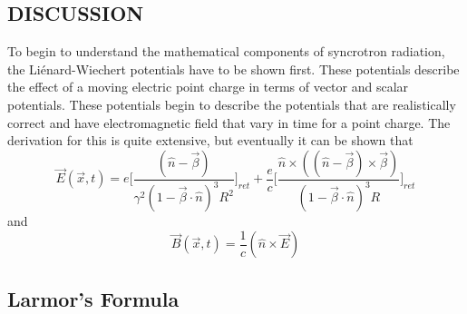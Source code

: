 \documentclass[a4paper]{article}
\begin{document}
\begin{center}
\section{DISCUSSION}
\end{center}

To begin to understand the mathematical components of syncrotron radiation, the Liénard-Wiechert potentials have to be shown first. These potentials describe the effect of a moving electric point charge in terms of vector and scalar potentials. These potentials begin to describe the potentials that are realistically correct and have electromagnetic field that vary in time for a point charge. The derivation for this is quite extensive, but eventually it can be shown that
\begin{equation}
\vec{E}(\vec{x}, t) = e \Bigg[\frac{(\hat{n} - \vec{\beta})}{\gamma^{2}(1 - \vec{\beta} \cdot \hat{n})^{3} R^{2}}\Bigg]_{ret} + \frac{e}{c} \Bigg[ \frac{\hat{n} \times ((\hat{n} - \vec{\beta}) \times \vec{\beta})}{(1 - \vec{\beta} \cdot \hat{n})^{3}R} \Bigg]_{ret}
\end{equation}
and
\begin{equation}
\vec{B}(\vec{x}, t) = \frac{1}{c}(\hat{n} \times \vec{E}) 
\end{equation}
\begin{center}
\subsection{Larmor's Formula}
\end{center}
\end{document}
